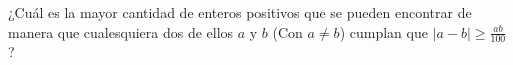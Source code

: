 ¿Cuál es la mayor cantidad de enteros positivos que se pueden encontrar de manera que cualesquiera dos de ellos $a$ y $b$ (Con $a\neq b$) cumplan que $\left| a-b \right|\geq \frac{ab}{100}$?